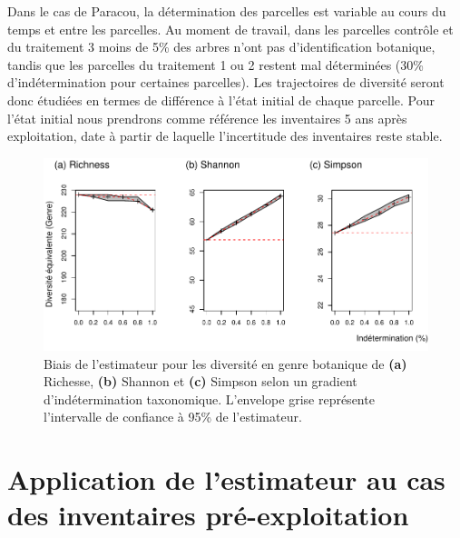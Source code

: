 \documentclass[
  11pt,
  french,
  A4paper,
  extrafontsizes,onecolumn,openright
  ]{memoir}
\begin{document}
Dans le cas de Paracou, la détermination des parcelles est variable au
cours du temps et entre les parcelles. Au moment de travail, dans les
parcelles contrôle et du traitement 3 moins de 5\% des arbres n'ont pas
d'identification botanique, tandis que les parcelles du traitement 1 ou
2 restent mal déterminées (30\% d'indétermination pour certaines
parcelles). Les trajectoires de diversité seront donc étudiées en termes
de différence à l'état initial de chaque parcelle. Pour l'état initial
nous prendrons comme référence les inventaires 5 ans après exploitation,
date à partir de laquelle l'incertitude des inventaires reste stable.

\begin{figure}

{\centering \includegraphics[width=1\linewidth]{Manuscript_files/figure-latex/FigTreesGenus-1} 

}

\caption{Biais de l'estimateur pour les diversité en genre botanique de \textbf{(a)} Richesse, \textbf{(b)} Shannon et \textbf{(c)} Simpson selon un gradient d'indétermination taxonomique. L'envelope grise représente l'intervalle de confiance à 95\% de l'estimateur.}\label{fig:FigTreesGenus}
\end{figure}

\section{Application de l'estimateur au cas des inventaires
pré-exploitation}\label{application-de-lestimateur-au-cas-des-inventaires-pre-exploitation}
\end{document}
